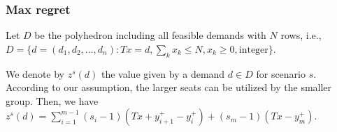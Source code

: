 







\subsubsection{Max regret}
Let $D$ be the polyhedron including all feasible demands with $N$ rows, i.e., 
$D = \{d = (d_1,d_2,\ldots, d_n): Tx = d,\sum_{k} x_k \leq N, x_k \geq 0, \mbox{integer} \}$.

We denote by $z^{s}(d)$ the value given by a demand $d \in D$ for scenario $s$. According to our assumption, the larger seats can be utilized by the smaller group. Then, we have
$z^{s}(d) = \sum_{i=1}^{m-1}(s_i -1)(Tx + y_{i+1}^{+}-y_{i}^{+}) + (s_m-1)(Tx- y_m^{+})$.

